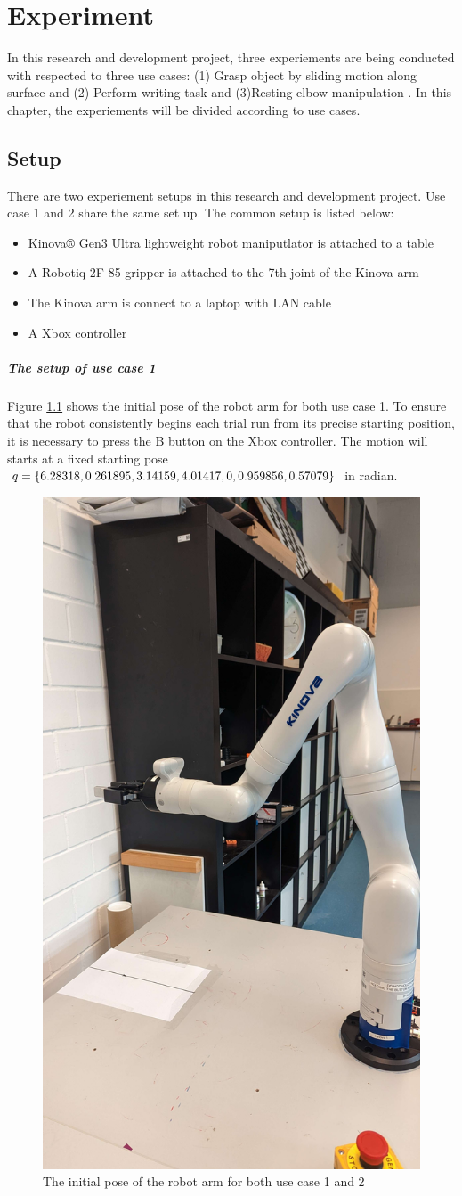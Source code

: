 \documentclass[report.tex]{subfiles}
\begin{document}
\chapter{Experiment}
In this research and development project, three experiements are being conducted with respected to three use cases: (1) Grasp object by sliding motion along surface and (2) Perform writing task and (3)Resting elbow manipulation . In this chapter, the experiements will be divided according to use cases.
    \section{Setup}
    There are two experiement setups in this research and development project. Use case 1 and 2 share the same set up.
    The common setup is listed below:
    \begin{itemize}
        \item Kinova® Gen3 Ultra lightweight robot maniputlator is attached to a table
        \item A Robotiq 2F-85 gripper is attached to the 7th joint of the Kinova arm
        \item The Kinova arm is connect to a laptop with LAN cable
        \item A Xbox controller
    \end{itemize}
    \paragraph{\large{The setup of use case 1}\\}
    Figure \ref{fig:us1_init} shows the initial pose of the robot arm for both use case 1. To ensure that the robot consistently begins each trial run from its precise starting position, it is necessary to press the B button on the Xbox controller. The motion will starts at a fixed starting pose $q = \{6.28318,0.261895,3.14159,4.01417,0,\\0.959856,0.57079\}$ in radian.
    \begin{figure}[!h]
        \centering
        \includegraphics[width=0.3\linewidth]{images/us1_initial.jpg}
        \caption{The initial pose of the robot arm for both use case 1 and 2}
        \label{fig:us1_init}
    \end{figure}
\end{document}

